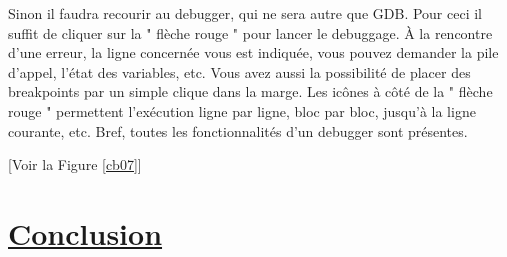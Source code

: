 \documentclass[a4paper, 12pt]{article}
\begin{document}
\begin{onehalfspacing}
Sinon il faudra recourir au debugger, qui ne sera autre que GDB. Pour ceci il suffit de cliquer sur la " flèche rouge " pour lancer le debuggage. À la rencontre d'une erreur, la ligne concernée vous est indiquée, vous pouvez demander la pile d'appel, l'état des variables, etc. Vous avez aussi la possibilité de placer des breakpoints par un simple clique dans la marge. Les icônes à côté de la " flèche rouge " permettent l’exécution ligne par ligne, bloc par bloc, jusqu'à la ligne courante, etc. Bref, toutes les fonctionnalités d'un debugger sont présentes.

[Voir la Figure \ref{cb07}]


\end{onehalfspacing}



\clearpage \section*{\underline{Conclusion}}  
\end{document}
